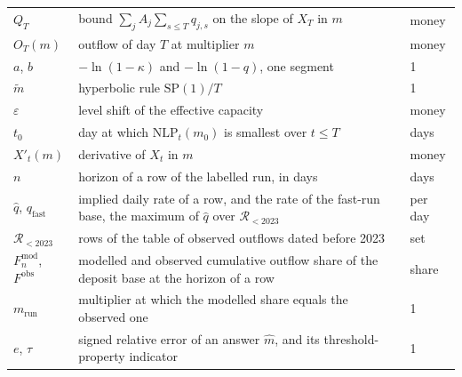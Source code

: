 \begin{table}[htbp]
\begin{tabular}{lp{9.2cm}l}
$Q_T$ & bound $\sum_jA_j\sum_{s\le T}q_{j,s}$ on the slope of $X_T$ in $m$ & money \\
$O_T(m)$ & outflow of day $T$ at multiplier $m$ & money \\
$a$, $b$ & $-\ln(1-\kappa)$ and $-\ln(1-q)$, one segment & 1 \\
$\tilde m$ & hyperbolic rule $\mathrm{SP}(1)/T$ & 1 \\
$\varepsilon$ & level shift of the effective capacity & money \\
$t_0$ & day at which $\mathrm{NLP}_t(m_0)$ is smallest over $t\le T$ & days \\
$X'_t(m)$ & derivative of $X_t$ in $m$ & money \\
$n$ & horizon of a row of the labelled run, in days & days \\
$\hat q$, $q_{\mathrm{fast}}$ & implied daily rate of a row, and the rate of the fast-run base, the maximum of $\hat q$ over $\mathcal R_{<2023}$ & per day \\
$\mathcal R_{<2023}$ & rows of the table of observed outflows dated before 2023 & set \\
$F^{\mathrm{mod}}_n$, $F^{\mathrm{obs}}$ & modelled and observed cumulative outflow share of the deposit base at the horizon of a row & share \\
$m_{\mathrm{run}}$ & multiplier at which the modelled share equals the observed one & 1 \\
$e$, $\tau$ & signed relative error of an answer $\hat m$, and its threshold-property indicator & 1 \\
\bottomrule
\end{tabular}
\end{table}
